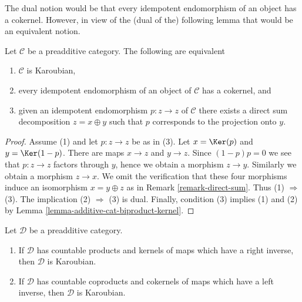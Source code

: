 \noindent
The dual notion would be that every idempotent endomorphism of an
object has a cokernel. However, in view of the (dual of the)
following lemma that would be an equivalent notion.

\begin{lemma}
\label{lemma-karoubian}
Let $\mathcal{C}$ be a preadditive category. The following
are equivalent
\begin{enumerate}
\item $\mathcal{C}$ is Karoubian,
\item every idempotent endomorphism of an object of $\mathcal{C}$ has a
cokernel, and
\item given an idempotent endomorphism $p : z \to z$ of $\mathcal{C}$
there exists a direct sum decomposition $z = x \oplus y$ such
that $p$ corresponds to the projection onto $y$.
\end{enumerate}
\end{lemma}

\begin{proof}
Assume (1) and let $p : z \to z$ be as in (3).
Let $x = \Ker(p)$ and $y = \Ker(1 - p)$. There are maps
$x \to z$ and $y \to z$. Since $(1 - p)p = 0$ we see that $p : z \to z$
factors through $y$, hence we obtain a morphism $z \to y$. Similarly
we obtain a morphism $z \to x$. We omit the verification that these
four morphisms induce an isomorphism $x = y \oplus z$ as in
Remark \ref{remark-direct-sum}.
Thus (1) $\Rightarrow$ (3). The implication (2) $\Rightarrow$ (3)
is dual. Finally, condition (3) implies (1) and (2) by
Lemma \ref{lemma-additive-cat-biproduct-kernel}.
\end{proof}

\begin{lemma}
\label{lemma-projectors-have-images}
Let $\mathcal{D}$ be a preadditive category.
\begin{enumerate}
\item If $\mathcal{D}$ has countable products and kernels of maps which
have a right inverse, then $\mathcal{D}$ is Karoubian.
\item If $\mathcal{D}$ has countable coproducts and cokernels of
maps which have a left inverse, then $\mathcal{D}$ is Karoubian.
\end{enumerate}
\end{lemma}

